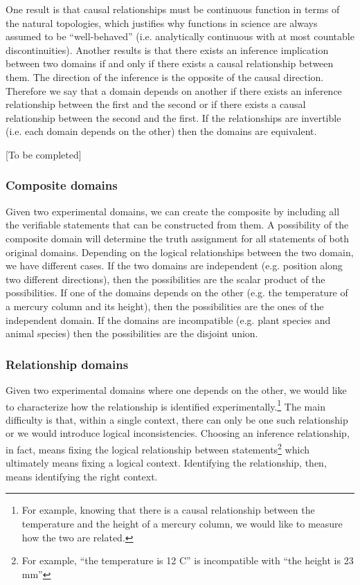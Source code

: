 \documentclass[twocolumn]{article}
\begin{document}
One result is that causal relationships must be continuous function in terms of the natural topologies, which justifies why functions in science are always assumed to be ``well-behaved'' (i.e. analytically continuous with at most countable discontinuities). Another results is that there exists an inference implication between two domains if and only if there exists a causal relationship between them. The direction of the inference is the opposite of the causal direction. Therefore we say that a domain depends on another if there exists an inference relationship between the first and the second or if there exists a causal relationship between the second and the first. If the relationships are invertible (i.e. each domain depends on the other) then the domains are equivalent.

[To be completed]


\subsubsection{Composite domains}

Given two experimental domains, we can create the composite by including all the verifiable statements that can be constructed from them. A possibility of the composite domain will determine the truth assignment for all statements of both original domains. Depending on the logical relationships between the two domain, we have different cases. If the two domains are independent (e.g. position along two different directions), then the possibilities are the scalar product of the possibilities. If one of the domains depends on the other (e.g. the temperature of a mercury column and its height), then the possibilities are the ones of the independent domain. If the domains are incompatible (e.g. plant species and animal species) then the possibilities are the disjoint union.


\subsubsection{Relationship domains}

Given two experimental domains where one depends on the other, we would like to characterize how the relationship is identified experimentally.\footnote{For example, knowing that there is a causal relationship between the temperature and the height of a mercury column, we would like to measure how the two are related.} The main difficulty is that, within a single context, there can only be one such relationship or we would introduce logical inconsistencies. Choosing an inference relationship, in fact, means fixing the logical relationship between statements\footnote{For example, ``the temperature is 12 C'' is incompatible with ``the height is 23 mm''} which ultimately means fixing a logical context. Identifying the relationship, then, means identifying the right context.
\end{document}
